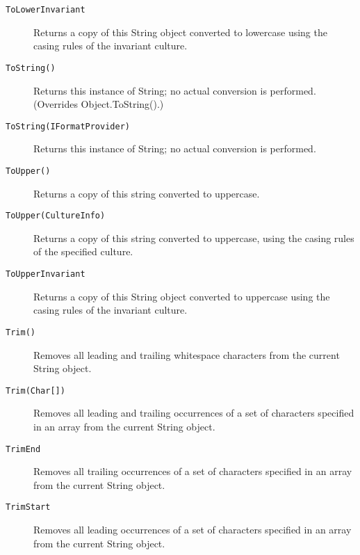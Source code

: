 \begin{description}
\item[\lstinline{ToLowerInvariant}] Returns a copy of this String object converted to lowercase using the casing rules of the invariant culture.
\item[\lstinline{ToString()}] Returns this instance of String; no actual conversion is performed. (Overrides Object.ToString().)
\item[\lstinline{ToString(IFormatProvider)}] Returns this instance of String; no actual conversion is performed.
\item[\lstinline{ToUpper()}] Returns a copy of this string converted to uppercase.
\item[\lstinline{ToUpper(CultureInfo)}] Returns a copy of this string converted to uppercase, using the casing rules of the specified culture.
\item[\lstinline{ToUpperInvariant}] Returns a copy of this String object converted to uppercase using the casing rules of the invariant culture.
\item[\lstinline{Trim()}] Removes all leading and trailing whitespace characters from the current String object.
\item[\lstinline{Trim(Char[])}] Removes all leading and trailing occurrences of a set of characters specified in an array from the current String object.
\item[\lstinline{TrimEnd}] Removes all trailing occurrences of a set of characters specified in an array from the current String object.
\item[\lstinline{TrimStart}] Removes all leading occurrences of a set of characters specified in an array from the current String object.
\end{description}


